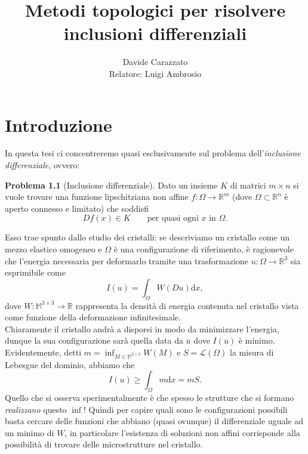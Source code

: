 \documentclass[a4paper,11pt]{book}
\title{\textbf{Metodi topologici per risolvere inclusioni differenziali}}
\author{Davide Carazzato\\Relatore: Luigi Ambrosio}
\theoremstyle{plain}
\theoremstyle{definition}
\newtheorem{prob}{Problema}
\theoremstyle{remark}
\newcommand{\R}{\mathbb{R}}
\newcommand{\M}{\mathbb{M}}
\newcommand{\LL}{\mathscr{L}}
\newcommand{\dx}{\text{d}x}
\begin{document}
\begin{frontespizio}
    \Punteggiatura{}
    \Rientro{1.5 cm}
    \Margini{1cm}{2cm}{1cm}{1cm}
\end{frontespizio}
\frontmatter
\pagestyle{plain}
\tableofcontents


\null\newpage
\thispagestyle{plain}

\pagestyle{fancy}


\chapter{Introduzione}
In questa tesi ci concentreremo quasi esclusivamente sul problema dell'\textit{inclusione differenziale}, ovvero:
\begin{prob}[Inclusione differenziale]\label{prob:1}
	Dato un insieme $K$ di matrici $m\times n$ si vuole trovare una funzione lipschitziana non affine $f:\Omega\to \R^m$ (dove $\Omega\subset \R^n$ è aperto connesso e limitato) che soddisfi
	\[
		Df(x)\in K\qquad\text{per quasi ogni }x\text{ in }\Omega.
	\]
\end{prob}
Esso trae spunto dallo studio dei cristalli: se descriviamo un cristallo come un mezzo elastico omogeneo e $\Omega$ è una configurazione di riferimento, è ragionevole che l'energia necessaria per deformarlo tramite una trasformazione $u:\Omega\to\R^3$ sia esprimibile come
\[
	I(u) = \int_{\Omega}W(Du)\dx,
\]
dove $W:\M^{3\times 3}\to\R$ rappresenta la densità di energia contenuta nel cristallo vista come funzione della deformazione infinitesimale.\\
Chiaramente il cristallo andrà a disporsi in modo da minimizzare l'energia, dunque la sua configurazione sarà quella data da $\overline{u}$ dove $I(\overline{u})$ è minimo. Evidentemente, detti $m=\inf_{M\in\M^{3\times 3}} W(M)$ e $S=\LL(\Omega)$ la misura di Lebesgue del dominio, abbiamo che
\begin{equation*}\label{eq:9}
	I(u) \geq \int_{\Omega}m\dx = mS.
\end{equation*}
Quello che si osserva sperimentalmente è che spesso le strutture che si formano \textit{realizzano} questo $\inf$! Quindi per capire quali sono le configurazioni possibili basta cercare delle funzioni che abbiano (quasi ovunque) il differenziale uguale ad un minimo di $W$, in particolare l'esistenza di soluzioni non affini corrisponde alla possibilità di trovare delle microstrutture nel cristallo.
\end{document}
